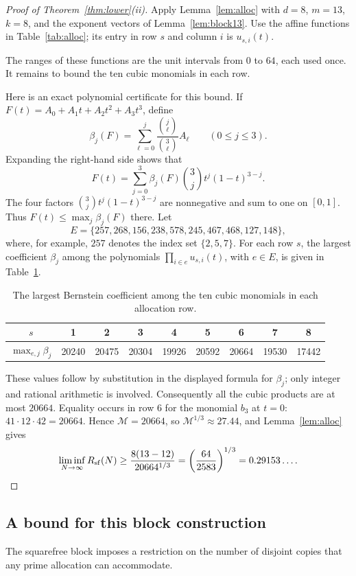 \documentclass[11pt]{article}
\numberwithin{equation}{section}
\theoremstyle{remark}
\begin{document}
\begin{proof}[Proof of Theorem~\ref{thm:lower}(ii)]
Apply Lemma~\ref{lem:alloc} with $d=8$, $m=13$, $k=8$, and the exponent vectors of Lemma~\ref{lem:block13}. Use the affine functions in Table~\ref{tab:alloc}; its entry in row $s$ and column $i$ is $u_{s,i}(t)$.

The ranges of these functions are the unit intervals from $0$ to $64$, each used once. It remains to bound the ten cubic monomials in each row.

Here is an exact polynomial certificate for this bound. If $F(t)=A_0+A_1t+A_2t^2+A_3t^3$, define
\[
\beta_j(F)=\sum_{\ell=0}^{j}\frac{\binom j\ell}{\binom3\ell}A_\ell\qquad(0\le j\le3).
\]
Expanding the right-hand side shows that
\[
F(t)=\sum_{j=0}^{3}\beta_j(F)\binom3jt^j(1-t)^{3-j}.
\]
The four factors $\binom3jt^j(1-t)^{3-j}$ are nonnegative and sum to one on $[0,1]$. Thus $F(t)\le\max_j\beta_j(F)$ there. Let
\[
E=\{257,268,156,238,578,245,467,468,127,148\},
\]
where, for example, $257$ denotes the index set $\{2,5,7\}$. For each row $s$, the largest coefficient $\beta_j$ among the polynomials $\prod_{i\in e}u_{s,i}(t)$, with $e\in E$, is given in Table~\ref{tab:bern}.

\begin{table}[ht]
\centering
\caption{The largest Bernstein coefficient among the ten cubic monomials in each allocation row.}\label{tab:bern}
\begin{tabular}{@{}c|cccccccc@{}}
$s$ & 1 & 2 & 3 & 4 & 5 & 6 & 7 & 8\\\hline
$\max_{e,j}\beta_j$ & 20240 & 20475 & 20304 & 19926 & 20592 & 20664 & 19530 & 17442
\end{tabular}
\end{table}

These values follow by substitution in the displayed formula for $\beta_j$; only integer and rational arithmetic is involved. Consequently all the cubic products are at most $20664$. Equality occurs in row $6$ for the monomial $b_3$ at $t=0$: $41\cdot12\cdot42=20664$. Hence $\mathcal M=20664$, so $\mathcal M^{1/3}\approx27.44$, and Lemma~\ref{lem:alloc} gives
\[
\liminf_{N\to\infty}R_{\mathrm{sf}}(N)\ge\frac{8(13-12)}{20664^{1/3}}=\left(\frac{64}{2583}\right)^{1/3}=0.29153\ldots.\qedhere
\]
\end{proof}

\subsection{A bound for this block construction}
The squarefree block imposes a restriction on the number of disjoint copies that any prime allocation can accommodate.
\end{document}

